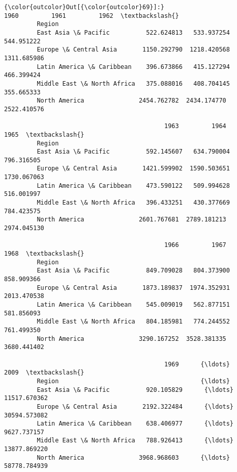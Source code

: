 \documentclass[11pt]{article}
\begin{document}
\begin{Verbatim}[commandchars=\\\{\}]
{\color{outcolor}Out[{\color{outcolor}69}]:}                                    1960         1961         1962  \textbackslash{}
         Region                                                              
         East Asia \& Pacific          522.624813   533.937254   544.951222   
         Europe \& Central Asia       1150.292790  1218.420568  1311.685986   
         Latin America \& Caribbean    396.673866   415.127294   466.399424   
         Middle East \& North Africa   375.088016   408.704145   355.665333   
         North America               2454.762782  2434.174770  2522.410576   
         
                                            1963         1964         1965  \textbackslash{}
         Region                                                              
         East Asia \& Pacific          592.145607   634.790004   796.316505   
         Europe \& Central Asia       1421.599902  1590.503651  1730.067063   
         Latin America \& Caribbean    473.590122   509.994628   516.001997   
         Middle East \& North Africa   396.433251   430.377669   784.423575   
         North America               2601.767681  2789.181213  2974.045130   
         
                                            1966         1967         1968  \textbackslash{}
         Region                                                              
         East Asia \& Pacific          849.709028   804.373900   858.909366   
         Europe \& Central Asia       1873.189837  1974.352931  2013.470538   
         Latin America \& Caribbean    545.009019   562.877151   581.856093   
         Middle East \& North Africa   804.185981   774.244552   761.499350   
         North America               3290.167252  3528.381335  3680.441402   
         
                                            1969      {\ldots}               2009  \textbackslash{}
         Region                                       {\ldots}                      
         East Asia \& Pacific          920.105829      {\ldots}       11517.670362   
         Europe \& Central Asia       2192.322484      {\ldots}       30594.573082   
         Latin America \& Caribbean    638.406977      {\ldots}        9627.737157   
         Middle East \& North Africa   788.926413      {\ldots}       13877.869220   
         North America               3968.968603      {\ldots}       58778.784939   
         

\end{Verbatim}
\end{document}
